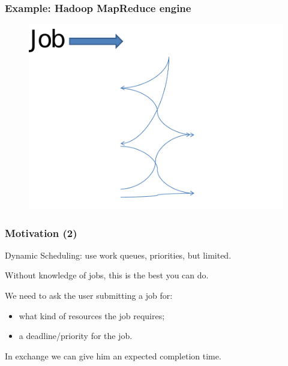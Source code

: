 \documentclass{beamer}
\newcommand{\hadoop}{\textsf{Hadoop}\xspace}
\begin{document}
\begin{frame}
  \frametitle{Example: \hadoop MapReduce engine}
  \begin{figure}
    \centering
    \includegraphics[scale=0.5]{hadoop}
  \end{figure}
\end{frame}

\begin{frame}
  \frametitle{Motivation (2)}

  Dynamic Scheduling: use work queues, priorities, but limited.

  \vspace{2ex}
  
  Without knowledge of jobs, this is the best you can do.

  \vspace{1cm}
  
  We need to ask the user submitting a job for:
  \begin{itemize}
  \item what kind of resources the job requires;
  \item a deadline/priority for the job.
  \end{itemize}

  \vspace{2ex}
  
  In exchange we can give him an expected completion time.

\end{frame}
\end{document}
